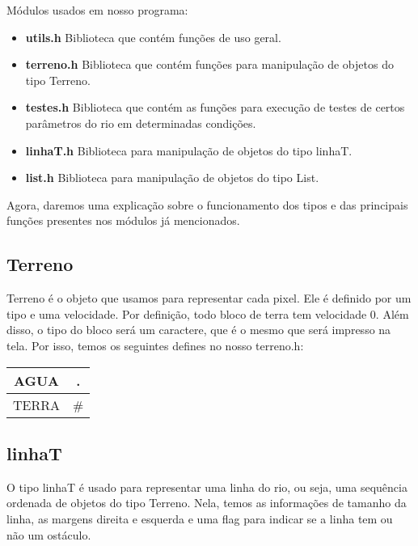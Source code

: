 \documentclass[11pt]{article}
\begin{document}
\begin{flushleft}
Módulos usados em nosso programa:

\begin{itemize}
	\item \textbf{utils.h} Biblioteca que contém funções de uso geral.
	
	\item \textbf{terreno.h} Biblioteca que contém funções para manipulação de 		objetos do tipo Terreno.
	
	\item \textbf{testes.h} Biblioteca que contém as funções para execução de testes de certos parâmetros do rio em determinadas condições.
	
	\item \textbf{linhaT.h} Biblioteca para manipulação de objetos do tipo linhaT.
	
	\item \textbf{list.h} Biblioteca para manipulação de objetos do tipo List.
	
\end{itemize}
\end{flushleft}

Agora, daremos uma explicação sobre o funcionamento dos tipos e das principais funções presentes nos módulos já mencionados.

\subsection{Terreno}

Terreno é o objeto que usamos para representar cada pixel. Ele é definido por um tipo e uma velocidade. Por definição, todo bloco de terra tem velocidade 0.
Além disso, o tipo do bloco será um caractere, que é o mesmo que será impresso na tela. Por isso, temos os seguintes defines no nosso terreno.h:
\begin{center}
\begin{tabular}{|c|c|}
\hline
AGUA & .\\
\hline
TERRA & \#\\
\hline
\end{tabular}
\end{center}



\subsection{linhaT}

O tipo linhaT é usado para representar uma linha do rio, ou seja, uma sequência ordenada de objetos do tipo Terreno. Nela, temos as informações de tamanho da linha, as margens direita e esquerda e uma flag para indicar se a linha tem ou não um ostáculo.
\end{document}
